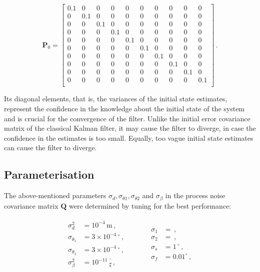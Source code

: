 \begin{equation}
\mathbf{P}_0 = \begin{bmatrix}
  0.1 & 0 & 0 & 0 & 0 & 0 & 0 & 0 & 0 & 0\\
  0 & 0.1 & 0 & 0 & 0 & 0 & 0 & 0 & 0 & 0\\
  0 & 0 & 0.1 & 0 & 0 & 0 & 0 & 0 & 0 & 0\\
  0 & 0 & 0 & 0.1 & 0 & 0 & 0 & 0 & 0 & 0\\
  0 & 0 & 0 & 0 & 0.1 & 0 & 0 & 0 & 0 & 0\\
  0 & 0 & 0 & 0 & 0 & 0.1 & 0 & 0 & 0 & 0\\
  0 & 0 & 0 & 0 & 0 & 0 & 0.1 & 0 & 0 & 0\\
  0 & 0 & 0 & 0 & 0 & 0 & 0 & 0.1 & 0 & 0\\
  0 & 0 & 0 & 0 & 0 & 0 & 0 & 0 & 0.1 & 0\\
  0 & 0 & 0 & 0 & 0 & 0 & 0 & 0 & 0 & 0.1\\
\end{bmatrix}\,.
\end{equation}

\noindent
Its diagonal elements, that is, the variances of the initial state estimates, represent the confidence in the knowledge about the initial state of the system and is crucial for the convergence of the filter. Unlike the initial error covariance matrix of the classical Kalman filter, it may cause the filter to diverge, in case the confidence in the estimates is too small. Equally, too vague initial state estimates can cause the filter to diverge.

\subsection{Parameterisation}

The above-mentioned parameters $\sigma_d, \sigma_{\theta 1}, \sigma_{\theta 2}$ and $\sigma_{\beta}$ in the process noise covariance matrix $\mathbf{Q}$ were determined by tuning for the best performance:

\begin{equation}
\begin{matrix}
	\begin{split}
	  \sigma^2_d &= 10^{-4}\,\mbox{m}\,, \\
	  \sigma_{\theta_1} &= 3 \times 10^{-4}\,^{\circ} \,, \\
	  \sigma_{\theta_2} &= 3 \times 10^{-4}\,^{\circ} \,, \\
	  \sigma^2_{\beta} &= 10^{-11} \, \frac{^{\circ}}{\mbox{s}} \,,
\end{split} \qquad \quad
    \begin{split}
	  \sigma_1 &= \,, \\
	  \sigma_2 &= \,, \\
	  \sigma_s &= 1\,^{\circ} \,, \\
	  \sigma_f &= 0.01^{\circ} \,,  
\end{split}
\end{matrix}
\end{equation}


